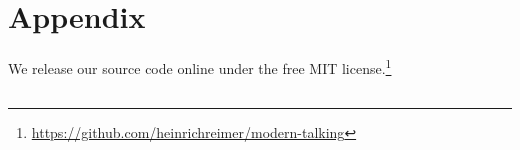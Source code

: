 \appendix
\section{Appendix}

We release our source code online under the free MIT license.\footnote{\url{https://github.com/heinrichreimer/modern-talking}}

\subsection{}



